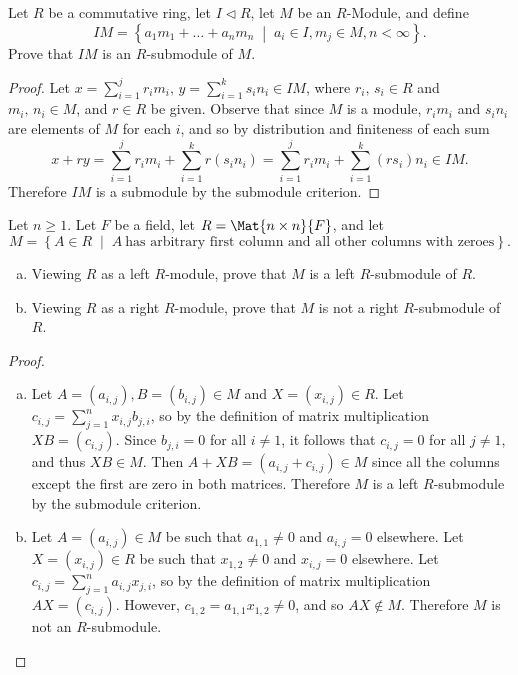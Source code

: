\documentclass[10pt]{amsart}
\begin{document}
\begin{thm}
  Let $R$ be a commutative ring, let $I \lhd R$, let $M$ be an $R$-Module, and define 
  $$IM = \left\{ a_1m_1 + \ldots + a_nm_n \;\middle\vert\; a_i \in I, m_j \in M, n < \infty\right\}.$$
  Prove that $IM$ is an $R$-submodule of $M$.
  
  \begin{proof}
    Let $x = \sum_{i = 1}^j r_im_i,\, y = \sum_{i = 1}^k s_i n_i \in IM$, where $r_i,\, s_i \in R$ and $m_i,\, n_i \in M$, and $r \in R$ be given.
    Observe that since $M$ is a module, $r_im_i$ and $s_i n_i$ are elements of $M$ for each $i$, and so by distribution and finiteness of each sum
    $$x + ry = \sum_{i = 1}^j r_im_i + \sum_{i = 1}^k r(s_i n_i) = \sum_{i = 1}^j r_im_i + \sum_{i = 1}^k (rs_i) n_i \in IM.$$
    Therefore $IM$ is a submodule by the submodule criterion.
  \end{proof}
\end{thm}

\begin{thm}
  Let $n \geq 1$.
  Let $F$ be a field, let $R = \Mat{n \times n}{F}$, and let 
  $$M = \left\{ A \in R \;\middle\vert\; A\ \text{has arbitrary first column and all other columns with zeroes}\right\}.$$
  \begin{enumerate}[(a)]
  \item
    Viewing $R$ as a left $R$-module, prove that $M$ is a left $R$-submodule of $R$.
  \item
    Viewing $R$ as a right $R$-module, prove that $M$ is not a right $R$-submodule of $R$.
  \end{enumerate}

  \begin{proof}
    \begin{enumerate}[(a)]
    \item
      Let $A = (a_{i,j}), B = (b_{i,j}) \in M$ and $X = (x_{i,j})\in R$.
      Let $c_{i,j} = \sum_{j = 1}^n x_{i,j} b_{j,i}$, so by the definition of matrix multiplication $XB = \left(c_{i,j}\right)$.
      Since $b_{j,i} = 0$ for all $i \neq 1$, it follows that $c_{i,j} = 0$ for all $j \neq 1$, and thus $XB \in M$.
      Then $A + XB = (a_{i,j} + c_{i,j}) \in M$ since all the columns except the first are zero in both matrices.
      Therefore $M$ is a left $R$-submodule by the submodule criterion.
    \item
      Let $A = (a_{i,j}) \in M$ be such that $a_{1,1} \neq 0$ and $a_{i,j} = 0$ elsewhere.
      Let $X = (x_{i,j})\in R$ be such that $x_{1,2} \neq 0$ and $x_{i,j} = 0$ elsewhere.
      Let $c_{i,j} = \sum_{j = 1}^n a_{i,j} x_{j,i}$, so by the definition of matrix multiplication $AX = \left(c_{i,j}\right)$.
      However, $c_{1,2} = a_{1,1}x_{1,2} \neq 0$, and so $AX \not \in M$.
      Therefore $M$ is not an $R$-submodule.
    \end{enumerate}
  \end{proof}
\end{thm}
\end{document}
